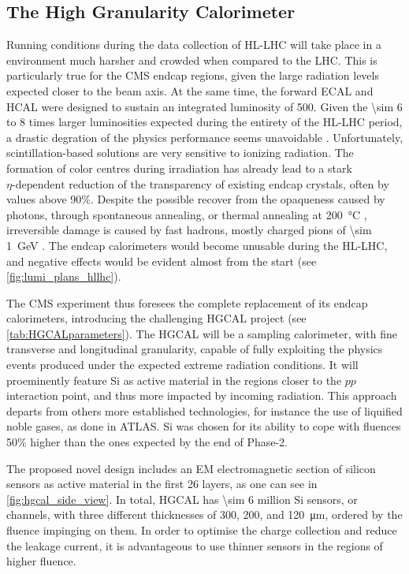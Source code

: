 \documentclass[11pt]{article}
\begin{document}
\subsection{The High Granularity Calorimeter}
\label{sec:org0647040}
\label{sec:hgcal_intro}

Running conditions during the data collection of \ac{HL-LHC} will take place in a environment much harsher and crowded when compared to the \ac{LHC}.
This is particularly true for the \ac{CMS} endcap regions, given the large radiation levels expected closer to the beam axis.
At the same time, the forward \ac{ECAL} and \ac{HCAL} were designed to sustain an integrated luminosity of \SI{500}{\invfb}.
Given the \num{\sim 6} to \num{8} times larger luminosities expected during the entirety of the \ac{HL-LHC} period, a drastic degration of the physics performance seems unavoidable \cite{hgcal_technical_proposal}.
Unfortunately, scintillation-based solutions are very sensitive to ionizing radiation.
The formation of color centres during irradiation has already lead to a stark \(\eta\text{-dependent}\) reduction of the transparency of existing endcap  crystals, often by values above 90\%.
Despite the possible recover from the opaqueness caused by photons, through spontaneous annealing, or thermal annealing at \SI{200}{\celsius} \cite{annealing_calorimeter}, irreversible damage is caused by fast hadrons, mostly charged pions of \SI{\sim 1}{\GeV} \cite{wigmans,wigmans2}.
The endcap calorimeters would become unusable during the \ac{HL-LHC}, and negative effects would be evident almost from the start (see \cref{fig:lumi_plans_hllhc}).

The CMS experiment thus foresees the complete replacement of its endcap calorimeters, introducing the challenging \ac{HGCAL} project \cite{hgcalTDR} (see \cref{tab:HGCALparameters}).
The \ac{HGCAL} will be a sampling calorimeter, with fine transverse and longitudinal granularity, capable of fully exploiting the physics events produced under the expected extreme radiation conditions.
It will proeminently feature \ac{Si} as active material in the regions closer to the \(pp\) interaction point, and thus more impacted by incoming radiation.
This approach departs from others more established technologies, for instance the use of liquified noble gases, as done in \ac{ATLAS}.
\ac{Si} was chosen for its ability to cope with fluences 50\% higher than the ones expected by the end of Phase-2.

The proposed novel design includes an \ac{EM} electromagnetic section of silicon sensors as active material in the first \num{26} layers, as one can see in \cref{fig:hgcal_side_view}.
In total, \ac{HGCAL} has \num{\sim 6} million \ac{Si} sensors, or channels, with three different thicknesses of \num{300}, \num{200}, and \SI{120}{\micro\meter}, ordered by the fluence impinging on them.
In order to optimise the charge collection and reduce the leakage current, it is advantageous to use thinner sensors in the regions of higher fluence.
\end{document}
